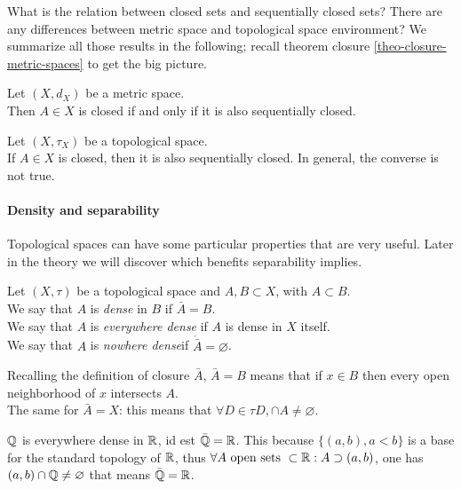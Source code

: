 What is the relation between closed sets and sequentially closed sets? There are any differences between metric space and topological space environment? We summarize all those results in the following; recall theorem closure \vref{theo-closure-metric-spaces} to get the big picture.
\begin{prop}\label{sequentially-closed-spaces-proposition}
	Let $(X, d_X)$ be a metric space.\\
	Then $A \in X$ is closed if and only if it is also sequentially closed.
	
	Let $(X, \tau_X)$ be a topological space.\\
	If $A \in X$ is closed, then it is also sequentially closed. In general, the converse is not true.
\end{prop}

\paragraph{Density and separability} Topological spaces can have some particular properties that are very useful. Later in the theory we will discover which benefits separability implies.

\begin{defn} \label{defn-density}
	Let $(X,\tau)$ be a topological space and $A, B \subset X$, with $A \subset B$. \\
	We say that $A$ is \emph{dense} in $B$ if $\bar A = B$.\\
	We say that $A$ is \emph{everywhere dense} if $A$ is dense in $X$ itself.\\
	We say that $A$ is \emph{nowhere dense}\footnotemark if $\mathring{\bar A} = \varnothing$\footnotemark.
\end{defn}
\addtocounter{footnote}{-1}
\addtocounter{footnote}{1}
Recalling the definition of closure $\bar A$, $\bar A = B$ means that if $x\in B$ then every open neighborhood of $x$ intersects $A$.\\
The same for $\bar A = X$: this means that $\forall D \in \tau D, \cap A \neq \varnothing$.

\begin{exam}
	$\mathbb Q$ is everywhere dense in $\mathbb R$, id est $\bar {\mathbb Q} = \mathbb R$. This because $\{ (a,b), a<b\}$ is a base for the standard topology of $\mathbb R$, thus $\forall A \text{ open sets } \subset \mathbb R : A \supset(a,b)$, one has $(a,b) \cap \mathbb Q \neq \varnothing$ that means $\bar {\mathbb Q} = \mathbb R$.
\end{exam}

